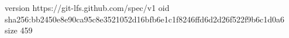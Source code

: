 version https://git-lfs.github.com/spec/v1
oid sha256:bb2450e8e90ca95c8e3521052d16bfb6e1c1f8246ffd6d2d26f522f9b6c1d0a6
size 459
